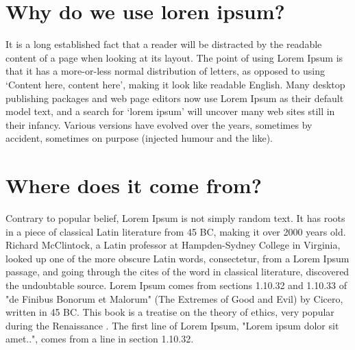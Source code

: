   \nomenclature[g-p]{$\pi$}{ $\simeq 3.14\ldots$}                                             %

\section{Why do we use loren ipsum?}\label{intro:why}

  It is a long established fact that a reader will be distracted by the readable content of a page when looking at its layout. The point of using Lorem Ipsum is that it has a more-or-less normal distribution of letters, as opposed to using `Content here, content here', making it look like readable English. Many desktop publishing packages and web page editors now use Lorem Ipsum as their default model text, and a search for `lorem ipsum' will uncover many web sites still in their infancy. Various versions have evolved over the years, sometimes by accident, sometimes on purpose (injected humour and the like).

\section{Where does it come from?}\label{intro:where} 

  Contrary to popular belief, Lorem Ipsum is not simply random text. It has roots in a piece of classical Latin literature from 45 BC, making it over 2000 years old. Richard McClintock, a Latin professor at Hampden-Sydney College in Virginia, looked up one of the more obscure Latin words, consectetur, from a Lorem Ipsum passage, and going through the cites of the word in classical literature, discovered the undoubtable source. Lorem Ipsum comes from sections 1.10.32 and 1.10.33 of "de Finibus Bonorum et Malorum" (The Extremes of Good and Evil) by Cicero, written in 45 BC. This book is a treatise on the theory of ethics, very popular during the Renaissance \cite{Abdulkadir2010,BENDIKSEN1984467,FALCONE20097,Fujita1990}. The first line of Lorem Ipsum, "Lorem ipsum dolor sit amet..", comes from a line in section 1.10.32.

